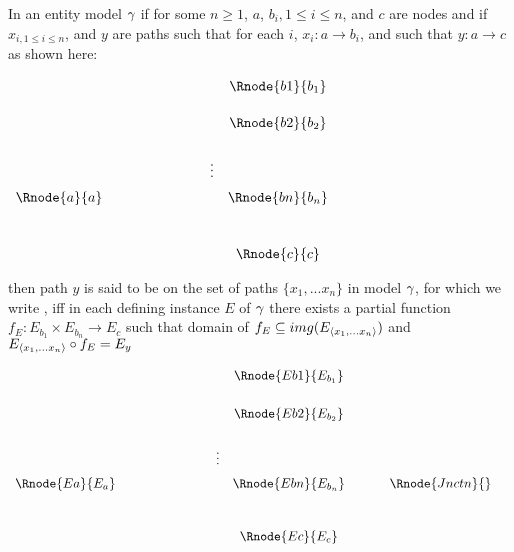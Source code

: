 \begin{definition} %
In an entity model $\gamma$  
if for some $n \geq 1$, $a$, $b_{i}, 1 \leq i \leq n$,  and $c$ are nodes and 
if  $x_{i, 1 \leq i \leq n}$, and $y$ are paths such
that for each $i$, $x_i : a \rightarrow b_i$, and such that $y: a \rightarrow c$ 
as shown here:
\setlength{\arraycolsep}{.2cm}
\begin{center}
$
\begin{array}{cp{2cm}cc}
             & &         & \Rnode{b1}{b_1} \\ [0.5cm]
						 & &         & \Rnode{b2}{b_2} \\ [0.6cm]
						 & & \vdots  &                 \\ [0.2cm]
\Rnode{a}{a} & &         & \Rnode{bn}{b_n} \\ [1.0cm]
             & &         & \Rnode{c}{c}   \\
\end{array}
$
\end{center}


\noindent 
then path $y$ is said to be  on the set of paths $\{x_1,...x_n\}$ in model $\gamma$, 
for which  we write  ,
iff
 in each defining instance $E$ of $\gamma$ there exists a  partial 
function $f_E: E_{b_1} \times E_{b_n} \rightarrow E_c$ 
\noindent such that 
domain of $f_E \subseteq img(E_{\langle x_1,... x_n \rangle})$ 
and  
$E_{\langle x_1,...x_n\rangle} \circ f_E = E_y$ 
\begin{center}
$
\begin{array}{cp{2cm}ccp{0.5cm}cc}
						    & &         & \Rnode{Eb1}{E_{b_1}}& &                            &        \\ [0.6cm]
						    & &         & \Rnode{Eb2}{E_{b_2}}& &                            &        \\ [0.6cm]
						    & &\vdots  &                      & &                            &        \\ [0.2cm]												
\Rnode{Ea}{E_a} & &         & \Rnode{Ebn}{E_{b_n}}& & \Rnode{Jnctn}{}&  \\ [1.0cm]
						    & &         & \Rnode{Ec}{{E_c}}   & &                            &        \\
\end{array}
$
\end{center}
\end{definition}

